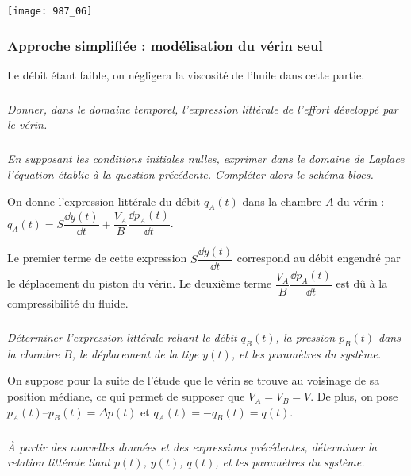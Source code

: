 \begin{center}
\texttt{[image: 987\_06]}%
\end{center}

\subsubsection*{Approche simplifiée : modélisation du vérin seul}
Le débit étant faible, on négligera la viscosité de l’huile dans cette partie.

\subparagraph{}
\textit{Donner, dans le domaine temporel, l’expression littérale de l’effort développé par le vérin.}
\ifprof
\begin{corrige}
\end{corrige}
\else
\fi

\subparagraph{}
\textit{En supposant les conditions initiales nulles, exprimer dans le domaine de Laplace
l’équation établie à la question précédente. Compléter alors le schéma-blocs.}
\ifprof
\begin{corrige}
\end{corrige}
\else
\fi

On donne l’expression littérale du débit $q_A(t)$ dans la chambre $A$ du vérin :
$q_A(t)=S\dfrac{\dd y(t)}{\dd t}+\dfrac{V_A}{B}\dfrac{\dd p_A(t)}{\dd t}$.

Le premier terme de cette expression $S\dfrac{\dd y(t)}{\dd t}$ correspond au débit engendré par le
déplacement du piston du vérin. Le deuxième terme $\dfrac{V_A}{B}\dfrac{\dd p_A(t)}{\dd t}$ est dû à la compressibilité
du fluide.

\subparagraph{}
\textit{Déterminer l’expression littérale reliant le débit $q_B(t)$, la pression $p_B(t)$ dans la
chambre $B$, le déplacement de la tige $y(t)$, et les paramètres du système.}
\ifprof
\begin{corrige}
\end{corrige}
\else
\fi


On suppose pour la suite de l’étude que le vérin se trouve au voisinage de sa position
médiane, ce qui permet de supposer que $V_A = V_B = V$.
De plus, on pose $p_A(t) – p_B(t)= \Delta p(t)$ et $q_A(t) = -q_B(t) = q(t)$.


\subparagraph{}
\textit{À partir des nouvelles données et des expressions précédentes, déterminer la
relation littérale liant  $p(t)$, $y(t)$, $q(t)$, et les paramètres du système.}
\ifprof
\begin{corrige}
\end{corrige}
\else
\fi

